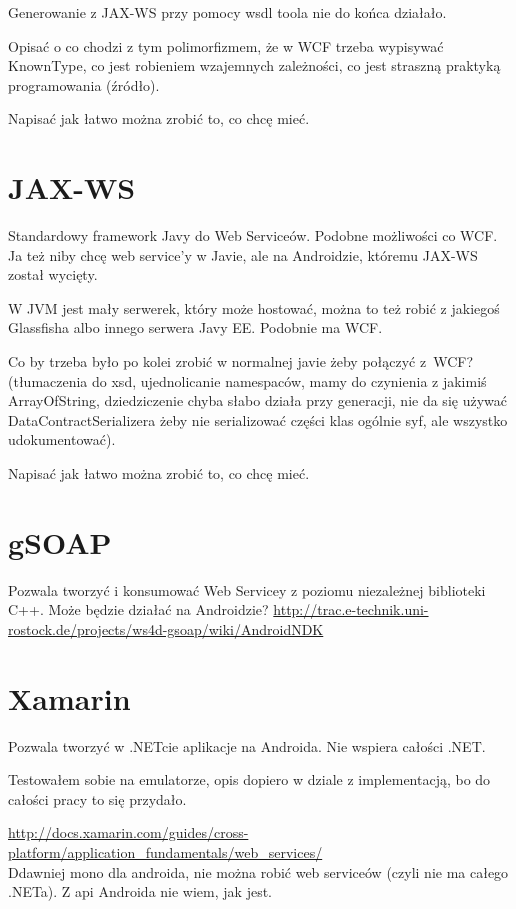 Generowanie z JAX-WS przy pomocy wsdl toola nie do końca działało.

Opisać o co chodzi z tym polimorfizmem, że w WCF trzeba wypisywać KnownType, co jest robieniem wzajemnych zależności, co jest straszną praktyką programowania (źródło).

Napisać jak łatwo można zrobić to, co chcę mieć.



\section{JAX-WS}
Standardowy framework Javy do Web Serviceów. Podobne możliwości co WCF\@. Ja też niby chcę web service'y w Javie, ale na Androidzie, któremu JAX-WS został wycięty.

W JVM jest mały serwerek, który może hostować, można to też robić z jakiegoś Glassfisha albo innego serwera Javy EE\@. Podobnie ma WCF.

Co by trzeba było po kolei zrobić w normalnej javie żeby połączyć z~WCF? (tłumaczenia do xsd, ujednolicanie namespaców, mamy do czynienia z jakimiś ArrayOfString, dziedziczenie chyba słabo działa przy generacji, nie da się używać DataContractSerializera żeby nie serializować części klas ogólnie syf, ale wszystko udokumentować). 

Napisać jak łatwo można zrobić to, co chcę mieć.



\section{gSOAP}
Pozwala tworzyć i konsumować Web Servicey z poziomu niezależnej biblioteki C++. Może będzie działać na Androidzie?
\url{http://trac.e-technik.uni-rostock.de/projects/ws4d-gsoap/wiki/AndroidNDK}\\

\section{Xamarin}
Pozwala tworzyć w .NETcie aplikacje na Androida. Nie wspiera całości .NET.

Testowałem sobie na emulatorze, opis dopiero w dziale z implementacją, bo do całości pracy to się przydało.

\url{http://docs.xamarin.com/guides/cross-platform/application_fundamentals/web_services/}\\
Ddawniej mono dla androida, nie można robić web serviceów (czyli nie ma całego .NETa). Z api Androida nie wiem, jak jest.

